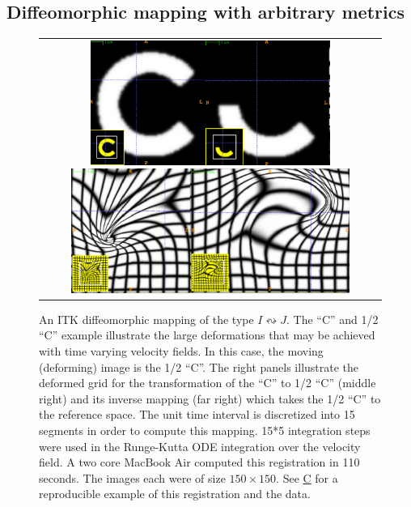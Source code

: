 \documentclass{frontiersSCNS}
\begin{document}
\subsection{Diffeomorphic mapping with arbitrary metrics}
\begin{figure}[t]
\begin{center}
\begin{tabular}{c}
\includegraphics[height=1.6in]{figs/c_chalf.pdf}
\includegraphics[height=1.6in]{figs/c_half_c_grids.pdf}
\end{tabular}
\caption{\baselineskip 12pt \small An ITK diffeomorphic mapping of the
  type $I \leftrightsquigarrow J $.  The 
``C'' and 1/2 ``C'' example illustrate the large deformations that may
be achieved with time varying velocity fields.  In this case, the moving (deforming) image is
the 1/2 ``C''.  The right panels illustrate the deformed grid for the
transformation of the ``C'' to 1/2 ``C'' (middle right) and its
inverse mapping (far right) which takes the 1/2 ``C'' to the reference
space.  The unit time interval is discretized into 15 segments in
order to compute this mapping.  15*5 integration steps were used in
the Runge-Kutta ODE integration over the velocity field.  A two
core MacBook Air computed this registration in 110 seconds.  The images
each were of size $150 \times 150$.  See
\href{http://stnava.github.io/C/}{C} for a reproducible example of
this registration and the data.}
\label{fig:chalf}
\end{center}
\end{figure}
\end{document}
